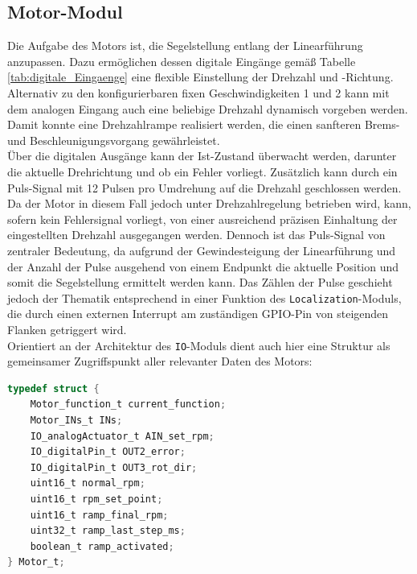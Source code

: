 \subsection{Motor-Modul}
Die Aufgabe des Motors ist, die Segelstellung entlang der Linearführung anzupassen. Dazu ermöglichen dessen digitale Eingänge gemäß Tabelle \ref{tab:digitale_Eingaenge} eine flexible Einstellung der Drehzahl und -Richtung. Alternativ zu den konfigurierbaren fixen Geschwindigkeiten 1 und 2 kann mit dem analogen Eingang auch eine beliebige Drehzahl dynamisch vorgeben werden. Damit konnte eine Drehzahlrampe realisiert werden, die einen sanfteren Brems- und Beschleunigungsvorgang gewährleistet.\\
Über die digitalen Ausgänge kann der Ist-Zustand überwacht werden, darunter die aktuelle Drehrichtung und ob ein Fehler vorliegt. Zusätzlich kann durch ein Puls-Signal mit 12 Pulsen pro Umdrehung auf die Drehzahl geschlossen werden. Da der Motor in diesem Fall jedoch unter Drehzahlregelung betrieben wird, kann, sofern kein Fehlersignal vorliegt, von einer ausreichend präzisen Einhaltung der eingestellten Drehzahl ausgegangen werden. Dennoch ist das Puls-Signal von zentraler Bedeutung, da aufgrund der Gewindesteigung der Linearführung und der Anzahl der Pulse ausgehend von einem Endpunkt die aktuelle Position und somit die Segelstellung ermittelt werden kann. Das Zählen der Pulse geschieht jedoch der Thematik entsprechend in einer Funktion des \verb|Localization|-Moduls, die durch einen externen Interrupt am zuständigen GPIO-Pin von steigenden Flanken getriggert wird.\\
Orientiert an der Architektur des \verb|IO|-Moduls dient auch hier eine Struktur als gemeinsamer Zugriffspunkt aller relevanter Daten des Motors:
\begin{lstlisting}[language=C, caption={Struktur des Motors}, label={lst:motor}]
typedef struct {
	Motor_function_t current_function;
	Motor_INs_t INs;
	IO_analogActuator_t AIN_set_rpm;
	IO_digitalPin_t OUT2_error;
	IO_digitalPin_t OUT3_rot_dir;
	uint16_t normal_rpm;
	uint16_t rpm_set_point;
	uint16_t ramp_final_rpm;
	uint32_t ramp_last_step_ms;
	boolean_t ramp_activated;
} Motor_t;
\end{lstlisting}
